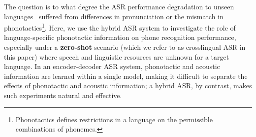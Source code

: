 \documentclass{article}
\begin{document}
The question is to what degree the ASR performance degradation to unseen languages~\cite{Zelasko2020That}   suffered from differences in pronunciation or the mismatch in phonotactics\footnote{Phonotactics defines restrictions in a language on the permissible combinations of phonemes.}.
Here, we  use the hybrid ASR system to investigate the role of language-specific  phonotactic 
information on phone recognition performance, especially under a \textbf{zero-shot} scenario (which we refer to as crosslingual ASR in this paper) where speech and linguistic resources are unknown for a target language. 
In an encoder-decoder ASR system, phonotactic and acoustic information are learned within a single model, making it 
difficult to separate the effects of phonotactic and acoustic information; a hybrid ASR, by contrast,
makes such experiments natural and effective.

\end{document}

